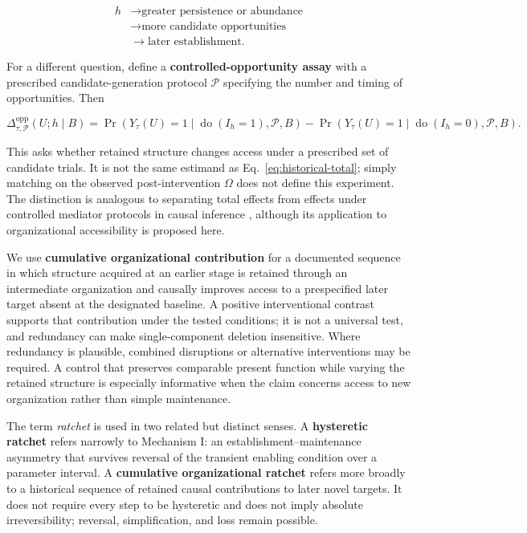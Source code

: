 \documentclass[11pt,a4paper]{article}
\begin{document}
\[
\begin{aligned}
h&\to\text{greater persistence or abundance}\\
 &\to\text{more candidate opportunities}\\
 &\to\text{later establishment}.
\end{aligned}
\]

For a different question, define a \textbf{controlled-opportunity assay} with a prescribed candidate-generation protocol $\mathcal P$ specifying the number and timing of opportunities. Then

\begin{equation}
\Delta_{\tau,\mathcal P}^{\mathrm{opp}}(U;h\mid B)
=
\Pr\!\left(Y_\tau(U)=1\mid\operatorname{do}(I_h=1),\mathcal P,B\right)
-
\Pr\!\left(Y_\tau(U)=1\mid\operatorname{do}(I_h=0),\mathcal P,B\right).
\label{eq:historical-controlled}
\end{equation}

This asks whether retained structure changes access under a prescribed set of candidate trials. It is not the same estimand as Eq.~\eqref{eq:historical-total}; simply matching on the observed post-intervention $\Omega$ does not define this experiment. The distinction is analogous to separating total effects from effects under controlled mediator protocols in causal inference \citep{VanderWeele2014}, although its application to organizational accessibility is proposed here.

We use \textbf{cumulative organizational contribution} for a documented sequence in which structure acquired at an earlier stage is retained through an intermediate organization and causally improves access to a prespecified later target absent at the designated baseline. A positive interventional contrast supports that contribution under the tested conditions; it is not a universal test, and redundancy can make single-component deletion insensitive. Where redundancy is plausible, combined disruptions or alternative interventions may be required. A control that preserves comparable present function while varying the retained structure is especially informative when the claim concerns access to new organization rather than simple maintenance.

The term \emph{ratchet} is used in two related but distinct senses. A \textbf{hysteretic ratchet} refers narrowly to Mechanism I: an establishment--maintenance asymmetry that survives reversal of the transient enabling condition over a parameter interval. A \textbf{cumulative organizational ratchet} refers more broadly to a historical sequence of retained causal contributions to later novel targets. It does not require every step to be hysteretic and does not imply absolute irreversibility; reversal, simplification, and loss remain possible.
\end{document}
